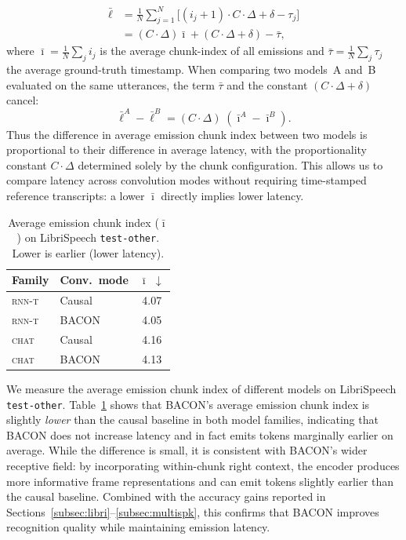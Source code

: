\documentclass[cameraready]{Interspeech}
\begin{document}
\begin{equation}
    \begin{aligned}
        \bar{\ell} &= \frac{1}{N}\sum_{j=1}^{N} \bigl[(i_j+1)\cdot C\cdot\Delta + \delta - \tau_j\bigr] \\
                   &= (C\cdot\Delta) \bar{\imath} + (C\cdot\Delta + \delta) - \bar{\tau},
    \end{aligned}
    \label{eq:avg-latency}
\end{equation}
where $\bar{\imath} = \frac{1}{N}\sum_j i_j$ is the average chunk-index of all
emissions and $\bar{\tau} = \frac{1}{N}\sum_j \tau_j$ the average
ground-truth timestamp. When comparing two models~A and~B evaluated on the
same utterances, the term $\bar{\tau}$ and the constant
$(C\cdot\Delta + \delta)$ cancel:
\begin{equation}
    \bar{\ell}^{A} - \bar{\ell}^{B} = (C\cdot\Delta)\;(\bar{\imath}^{A} - \bar{\imath}^{B}).
    \label{eq:latency-diff}
\end{equation}
Thus the difference in average emission chunk index between two models is
proportional to their difference in average latency, with the proportionality
constant $C\cdot\Delta$ determined solely by the chunk configuration. This
allows us to compare latency across convolution modes without requiring
time-stamped reference transcripts: a lower $\bar{\imath}$ directly implies lower
latency.

\begin{table}[h]
\centering
\caption{Average emission chunk index ($\bar{\imath}$) on LibriSpeech
\texttt{test-other}. Lower is earlier (lower latency).}
\label{tab:latency}
\begin{tabular}{llc}
\toprule
\textbf{Family} & \textbf{Conv.\ mode} & $\bar{\imath}$ $\downarrow$ \\
\midrule
\textsc{rnn-t} & Causal & 4.07 \\
\textsc{rnn-t} & BACON  & 4.05 \\
\midrule
\textsc{chat} & Causal & 4.16 \\
\textsc{chat} & BACON  & 4.13 \\
\bottomrule
\end{tabular}
\end{table}

We measure the average emission chunk index of different models on
LibriSpeech \texttt{test-other}. Table~\ref{tab:latency} shows that BACON's
average emission chunk index is
slightly \emph{lower} than the causal baseline in both model families,
indicating that BACON does not increase latency and in fact emits tokens
marginally earlier on average. 
While the difference is small, it is consistent
with BACON's wider receptive field: by incorporating within-chunk right
context, the encoder produces more informative frame representations and can
emit tokens slightly earlier than the causal baseline. Combined with
the accuracy gains reported in
Sections~\ref{subsec:libri}--\ref{subsec:multispk}, this confirms that BACON
improves recognition quality while maintaining  emission latency.
\end{document}
